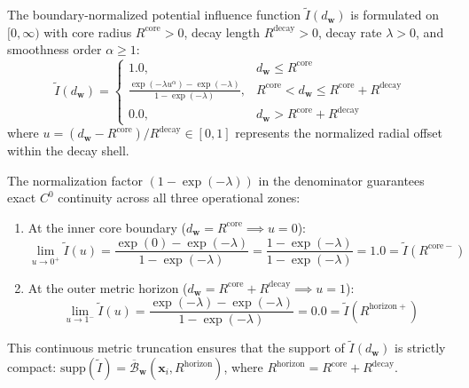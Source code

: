 \documentclass[times, review, 10pt]{elsarticle}
\begin{document}
The boundary-normalized potential influence function $\tilde{I}(d_{\mathbf{w}})$ is formulated on $[0, \infty)$ with core radius $R^{\mathrm{core}} > 0$, decay length $R^{\mathrm{decay}} > 0$, decay rate $\lambda > 0$, and smoothness order $\alpha \ge 1$:
\begin{equation}
\tilde{I}(d_{\mathbf{w}}) = 
\begin{cases}
1.0, & d_{\mathbf{w}} \le R^{\mathrm{core}} \\
\displaystyle \frac{\exp(-\lambda u^\alpha) - \exp(-\lambda)}{1 - \exp(-\lambda)}, & R^{\mathrm{core}} < d_{\mathbf{w}} \le R^{\mathrm{core}} + R^{\mathrm{decay}} \\
0.0, & d_{\mathbf{w}} > R^{\mathrm{core}} + R^{\mathrm{decay}}
\end{cases}
\label{eq:normalized_kernel}
\end{equation}
where $u = (d_{\mathbf{w}} - R^{\mathrm{core}}) / R^{\mathrm{decay}} \in [0, 1]$ represents the normalized radial offset within the decay shell.

The normalization factor $(1 - \exp(-\lambda))$ in the denominator guarantees exact $C^0$ continuity across all three operational zones:
\begin{enumerate}
    \item At the inner core boundary ($d_{\mathbf{w}} = R^{\mathrm{core}} \implies u = 0$):
    \begin{equation}
    \lim_{u \to 0^+} \tilde{I}(u) = \frac{\exp(0) - \exp(-\lambda)}{1 - \exp(-\lambda)} = \frac{1 - \exp(-\lambda)}{1 - \exp(-\lambda)} = 1.0 = \tilde{I}(R^{\mathrm{core}-})
    \end{equation}
    \item At the outer metric horizon ($d_{\mathbf{w}} = R^{\mathrm{core}} + R^{\mathrm{decay}} \implies u = 1$):
    \begin{equation}
    \lim_{u \to 1^-} \tilde{I}(u) = \frac{\exp(-\lambda) - \exp(-\lambda)}{1 - \exp(-\lambda)} = 0.0 = \tilde{I}(R^{\mathrm{horizon}+})
    \end{equation}
\end{enumerate}
This continuous metric truncation ensures that the support of $\tilde{I}(d_{\mathbf{w}})$ is strictly compact: $\mathrm{supp}(\tilde{I}) = \overline{\mathcal{B}}_{\mathbf{w}}(\mathbf{x}_i, R^{\mathrm{horizon}})$, where $R^{\mathrm{horizon}} = R^{\mathrm{core}} + R^{\mathrm{decay}}$.
\end{document}
